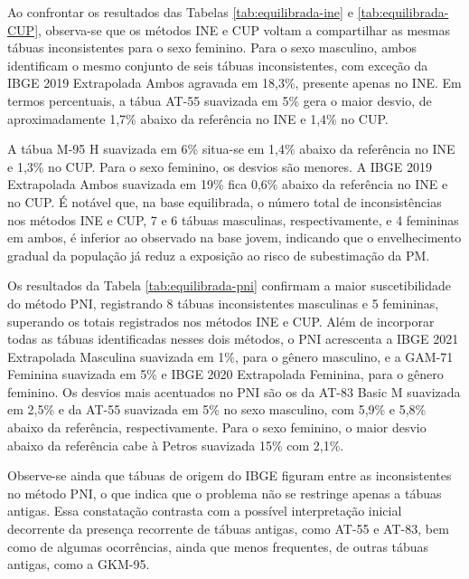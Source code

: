 Ao confrontar os resultados das Tabelas \ref{tab:equilibrada-ine} e \ref{tab:equilibrada-CUP}, observa-se que os métodos INE e CUP voltam a compartilhar as mesmas tábuas inconsistentes para o sexo feminino. Para o sexo masculino, ambos identificam o mesmo conjunto de seis tábuas inconsistentes, com exceção da IBGE 2019 Extrapolada Ambos agravada em 18,3\%, presente apenas no INE. Em termos percentuais, a tábua AT-55 suavizada em 5\% gera o maior desvio, de aproximadamente 1,7\% abaixo da referência no INE e 1,4\% no CUP. 

A tábua M-95 H suavizada em 6\% situa-se em 1,4\% abaixo da referência no INE e 1,3\% no CUP. Para o sexo feminino, os desvios são menores. A IBGE 2019 Extrapolada Ambos suavizada em 19\% fica 0,6\% abaixo da referência no INE e no CUP. É notável que, na base equilibrada, o número total de inconsistências nos métodos INE e CUP, 7 e 6 tábuas masculinas, respectivamente, e 4 femininas em ambos, é inferior ao observado na base jovem, indicando que o envelhecimento gradual da população já reduz a exposição ao risco de subestimação da PM.

Os resultados da Tabela \ref{tab:equilibrada-pni} confirmam a maior suscetibilidade do método PNI, registrando 8 tábuas inconsistentes masculinas e 5 femininas, superando os totais registrados nos métodos INE e CUP. Além de incorporar todas as tábuas identificadas nesses dois métodos, o PNI acrescenta a IBGE 2021 Extrapolada Masculina suavizada em 1\%, para o gênero masculino, e a GAM-71 Feminina suavizada em 5\% e IBGE 2020 Extrapolada Feminina, para o gênero feminino. Os desvios mais acentuados no PNI são os da AT-83 Basic M suavizada em 2,5\% e da AT-55 suavizada em 5\% no sexo masculino, com 5,9\% e 5,8\% abaixo da referência, respectivamente. Para o sexo feminino, o maior desvio abaixo da referência cabe à Petros suavizada 15\% com 2,1\%.

Observe-se ainda que tábuas de origem do IBGE figuram entre as inconsistentes no método PNI, o que indica que o problema não se restringe apenas a tábuas antigas. Essa constatação contrasta com a possível interpretação inicial decorrente da presença recorrente de tábuas antigas, como AT-55 e AT-83, bem como de algumas ocorrências, ainda que menos frequentes, de outras tábuas antigas, como a GKM-95.

